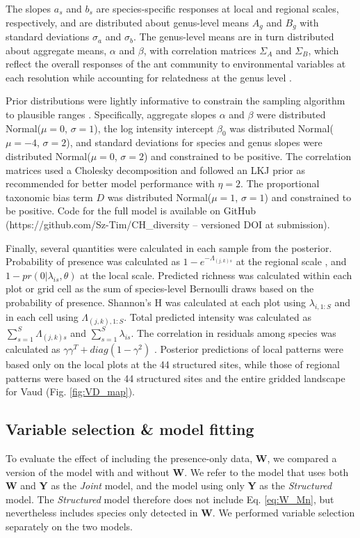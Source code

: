 \documentclass[preprint,review,times,12pt,3p]{elsarticle}
\begin{document}
The slopes $a_s$ and $b_s$ are species-specific responses at local and regional scales, respectively, and are distributed about genus-level means $A_g$ and $B_g$ with standard deviations $\sigma_a$ and $\sigma_b$. The genus-level means are in turn distributed about aggregate means, $\alpha$ and $\beta$, with correlation matrices $\Sigma_A$ and $\Sigma_B$, which reflect the overall responses of the ant community to environmental variables at each resolution while accounting for relatedness at the genus level \citep{Hadfield2010b,Ovaskainen2011,Szewczyk2018,Caradima2019}.

Prior distributions were lightly informative to constrain the sampling algorithm to plausible ranges \citep{Carpenter2017,Lemoine2019}. Specifically, aggregate slopes $\alpha$ and $\beta$ were distributed Normal($\mu=0$, $\sigma=1$), the log intensity intercept $\beta_0$ was distributed Normal($\mu=-4$, $\sigma=2$), and standard deviations for species and genus slopes were distributed Normal($\mu=0$, $\sigma=2$) and constrained to be positive. The correlation matrices used a Cholesky decomposition and followed an LKJ prior as recommended for better model performance \citep{Carpenter2017,Caradima2019} with $\eta=2$. The proportional taxonomic bias term $D$ was distributed Normal($\mu=1$, $\sigma=1$) and constrained to be positive. Code for the full model is available on GitHub (https://github.com/Sz-Tim/CH\_diversity -- versioned DOI at submission).

Finally, several quantities were calculated in each sample from the posterior. Probability of presence was calculated as $1 - e^{-\Lambda_{(j,k)s}}$ at the regional scale \citep{Hefley2016}, and $1 - pr(0 | \lambda_{is}, \theta)$ at the local scale. Predicted richness was calculated within each plot or grid cell as the sum of species-level Bernoulli draws based on the probability of presence. Shannon's H was calculated at each plot using $\lambda_{i,1:S}$ and in each cell using $\Lambda_{(j,k),1:S}$. Total predicted intensity was calculated as $\sum_{s=1}^{S}\Lambda_{(j,k)s}$ and $\sum_{s=1}^{S}\lambda_{is}$. The correlation in residuals among species was calculated as $\gamma \gamma^T + diag(1 - \gamma^2)$ \citep{Tobler2019}. Posterior predictions of local patterns were based only on the local plots at the 44 structured sites, while those of regional patterns were based on the 44 structured sites and the entire gridded landscape for Vaud (Fig. \ref{fig:VD_map}). 


\subsection{Variable selection \& model fitting}
To evaluate the effect of including the presence-only data, \textbf{W}, we compared a version of the model with and without \textbf{W}. We refer to the model that uses both \textbf{W} and \textbf{Y} as the \emph{Joint} model, and the model using only \textbf{Y} as the \emph{Structured} model. The \emph{Structured} model therefore does not include Eq. \ref{eq:W_Mn}, but nevertheless includes species only detected in \textbf{W}. We performed variable selection separately on the two models.
\end{document}
